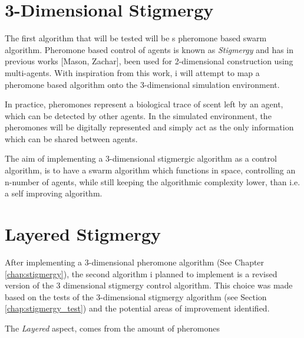 \section{3-Dimensional Stigmergy}
\label{sec:3dimstig}
The first algorithm that will be tested will be s pheromone based swarm algorithm. Pheromone based control of agents is known as \textit{Stigmergy} \cite{mason_programming_2003} and has in previous works [Mason, Zachar], been used for 2-dimensional construction using multi-agents. With inspiration from this work, i will attempt to map a pheromone based algorithm onto the 3-dimensional simulation environment. 

In practice, pheromones represent a biological trace of scent left by an agent, which can be detected by other agents. In the simulated environment, the pheromones will be digitally represented and simply act as the only information which can be shared between agents. 

The aim of implementing a 3-dimensional stigmergic algorithm as a control algorithm, is to have a swarm algorithm which functions in space, controlling an n-number of agents, while still keeping the algorithmic complexity lower, than i.e. a self improving algorithm. 
 
\section{Layered Stigmergy}
After implementing a 3-dimensional pheromone algorithm (See Chapter \ref{chap:stigmergy}), the second algorithm i planned to implement is a revised version of the 3 dimensional stigmergy control algorithm. This choice was made based on the tests of the 3-dimensional stigmergy algorithm (see Section \ref{chap:stigmergy_test}) and the potential areas of improvement identified. 

The \textit{Layered} aspect, comes from the amount of pheromones



